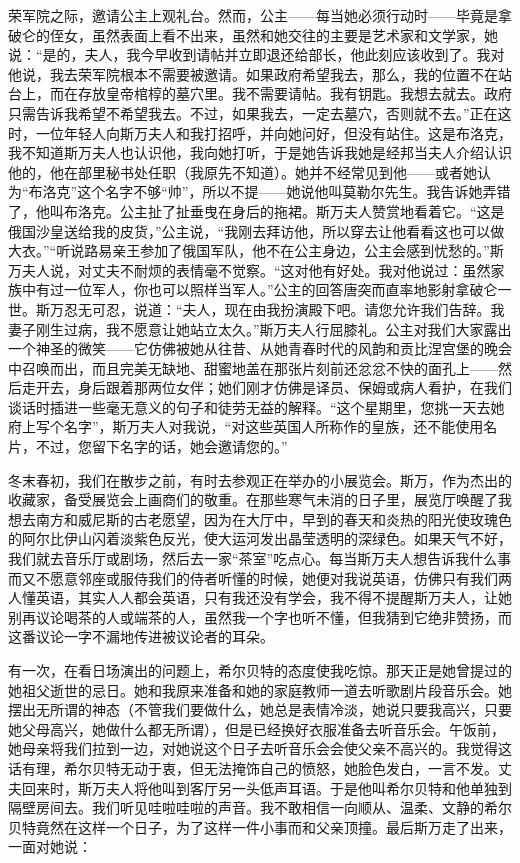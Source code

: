 荣军院之际，邀请公主上观礼台。然而，公主——每当她必须行动时——毕竟是拿破仑的侄女，虽然表面上看不出来，虽然和她交往的主要是艺术家和文学家，她说：“是的，夫人，我今早收到请帖并立即退还给部长，他此刻应该收到了。我对他说，我去荣军院根本不需要被邀请。如果政府希望我去，那么，我的位置不在站台上，而在存放皇帝棺椁的墓穴里。我不需要请帖。我有钥匙。我想去就去。政府只需告诉我希望不希望我去。不过，如果我去，一定去墓穴，否则就不去。”正在这时，一位年轻人向斯万夫人和我打招呼，并向她问好，但没有站住。这是布洛克，我不知道斯万夫人也认识他，我向她打听，于是她告诉我她是经邦当夫人介绍认识他的，他在部里秘书处任职（我原先不知道）。她并不经常见到他——或者她认为“布洛克”这个名字不够“帅”，所以不提——她说他叫莫勒尔先生。我告诉她弄错了，他叫布洛克。公主扯了扯垂曳在身后的拖裙。斯万夫人赞赏地看着它。“这是俄国沙皇送给我的皮货，”公主说，“我刚去拜访他，所以穿去让他看看这也可以做大衣。”“听说路易亲王参加了俄国军队，他不在公主身边，公主会感到忧愁的。”斯万夫人说，对丈夫不耐烦的表情毫不觉察。“这对他有好处。我对他说过：虽然家族中有过一位军人，你也可以照样当军人。”公主的回答唐突而直率地影射拿破仑一世。斯万忍无可忍，说道：“夫人，现在由我扮演殿下吧。请您允许我们告辞。我妻子刚生过病，我不愿意让她站立太久。”斯万夫人行屈膝礼。公主对我们大家露出一个神圣的微笑——它仿佛被她从往昔、从她青春时代的风韵和贡比涅宫堡的晚会中召唤而出，而且完美无缺地、甜蜜地盖在那张片刻前还忿忿不快的面孔上——然后走开去，身后跟着那两位女伴；她们刚才仿佛是译员、保姆或病人看护，在我们谈话时插进一些毫无意义的句子和徒劳无益的解释。“这个星期里，您挑一天去她府上写个名字”，斯万夫人对我说，“对这些英国人所称作的皇族，还不能使用名片，不过，您留下名字的话，她会邀请您的。”
\par 冬末春初，我们在散步之前，有时去参观正在举办的小展览会。斯万，作为杰出的收藏家，备受展览会上画商们的敬重。在那些寒气未消的日子里，展览厅唤醒了我想去南方和威尼斯的古老愿望，因为在大厅中，早到的春天和炎热的阳光使玫瑰色的阿尔比伊山闪着淡紫色反光，使大运河发出晶莹透明的深绿色。如果天气不好，我们就去音乐厅或剧场，然后去一家“茶室”吃点心。每当斯万夫人想告诉我什么事而又不愿意邻座或服侍我们的侍者听懂的时候，她便对我说英语，仿佛只有我们两人懂英语，其实人人都会英语，只有我还没有学会，我不得不提醒斯万夫人，让她别再议论喝茶的人或端茶的人，虽然我一个字也听不懂，但我猜到它绝非赞扬，而这番议论一字不漏地传进被议论者的耳朵。
\par 有一次，在看日场演出的问题上，希尔贝特的态度使我吃惊。那天正是她曾提过的她祖父逝世的忌日。她和我原来准备和她的家庭教师一道去听歌剧片段音乐会。她摆出无所谓的神态（不管我们要做什么，她总是表情冷淡，她说只要我高兴，只要她父母高兴，她做什么都无所谓），但是已经换好衣服准备去听音乐会。午饭前，她母亲将我们拉到一边，对她说这个日子去听音乐会会使父亲不高兴的。我觉得这话有理，希尔贝特无动于衷，但无法掩饰自己的愤怒，她脸色发白，一言不发。丈夫回来时，斯万夫人将他叫到客厅另一头低声耳语。于是他叫希尔贝特和他单独到隔壁房间去。我们听见哇啦哇啦的声音。我不敢相信一向顺从、温柔、文静的希尔贝特竟然在这样一个日子，为了这样一件小事而和父亲顶撞。最后斯万走了出来，一面对她说：
